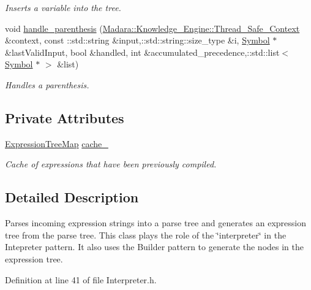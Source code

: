 \begin{DoxyCompactItemize}
\begin{DoxyCompactList}\small\item\em Inserts a variable into the tree. \item\end{DoxyCompactList}\item 
void \hyperlink{classMadara_1_1Expression__Tree_1_1Interpreter_a3ac16f422cb557b70683560147d75081}{handle\_\-parenthesis} (\hyperlink{classMadara_1_1Knowledge__Engine_1_1Thread__Safe__Context}{Madara::Knowledge\_\-Engine::Thread\_\-Safe\_\-Context} \&context, const ::std::string \&input,::std::string::size\_\-type \&i, \hyperlink{classMadara_1_1Expression__Tree_1_1Symbol}{Symbol} $\ast$\&lastValidInput, bool \&handled, int \&accumulated\_\-precedence,::std::list$<$ \hyperlink{classMadara_1_1Expression__Tree_1_1Symbol}{Symbol} $\ast$ $>$ \&list)
\begin{DoxyCompactList}\small\item\em Handles a parenthesis. \item\end{DoxyCompactList}\end{DoxyCompactItemize}
\subsection*{Private Attributes}
\begin{DoxyCompactItemize}
\item 
\hyperlink{namespaceMadara_1_1Expression__Tree_a788e8f51bae001516b9aec802d9decf5}{ExpressionTreeMap} \hyperlink{classMadara_1_1Expression__Tree_1_1Interpreter_a76f82b96d38b2c329599e62ccf78c00a}{cache\_\-}
\begin{DoxyCompactList}\small\item\em Cache of expressions that have been previously compiled. \item\end{DoxyCompactList}\end{DoxyCompactItemize}


\subsection{Detailed Description}
Parses incoming expression strings into a parse tree and generates an expression tree from the parse tree. This class plays the role of the \char`\"{}interpreter\char`\"{} in the Intepreter pattern. It also uses the Builder pattern to generate the nodes in the expression tree. 

Definition at line 41 of file Interpreter.h.



